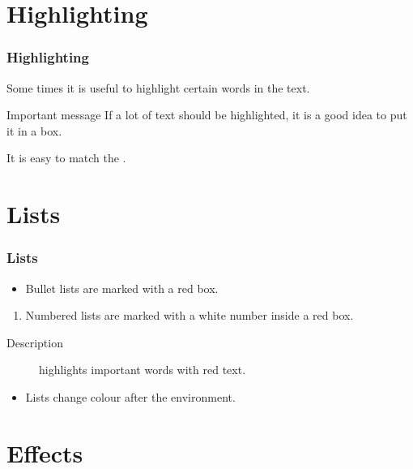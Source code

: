 \documentclass{beamer}
\begin{document}
\section{Highlighting}

\begin{frame}
    \frametitle{Highlighting}

    Some times it is useful to \alert{highlight} certain words in the text.

    \begin{alertblock}{Important message}
        If a lot of text should be \alert{highlighted}, it is a good idea to put it in a box.
    \end{alertblock}

    It is easy to match the .
\end{frame}

\section{Lists}

\begin{frame}
    \frametitle{Lists}

    \begin{itemize}
        \item
        Bullet lists are marked with a red box.
    \end{itemize}

    \begin{enumerate}
        \item
        Numbered lists are marked with a white number inside a red box.
    \end{enumerate}

    \begin{description}
        \item[Description] highlights important words with red text.
    \end{description}

    \begin{example}
        \begin{itemize}
            \item
            Lists change colour after the environment.
        \end{itemize}
    \end{example}
\end{frame}

\section{Effects}
\end{document}
